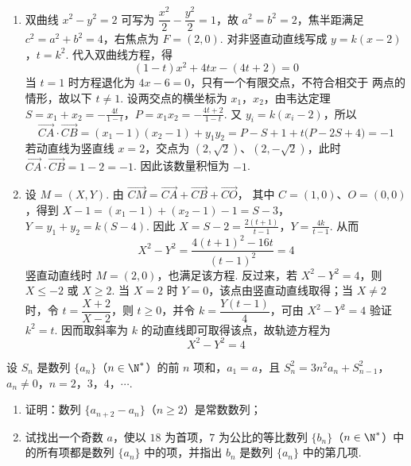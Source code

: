 \begin{solution}
\begin{enumerate}
\item 双曲线 \(x^2-y^2=2\) 可写为
\(\dfrac{x^2}{2}-\dfrac{y^2}{2}=1\)，故
\(a^2=b^2=2\)，焦半距满足 \(c^2=a^2+b^2=4\)，右焦点为
\(F=(2,0)\). 对非竖直动直线写成
\(y=k(x-2)\)，\(t=k^2\).
代入双曲线方程，得
\[
(1-t)x^2+4tx-(4t+2)=0
\]
当 \(t=1\) 时方程退化为 \(4x-6=0\)，只有一个有限交点，不符合相交于
两点的情形，故以下 \(t\ne1\). 设两交点的横坐标为 \(x_1\)，\(x_2\)，由韦达定理
\(S=x_1+x_2=-\frac{4t}{1-t}\)，\(P=x_1x_2=-\frac{4t+2}{1-t}\).
又 \(y_i=k(x_i-2)\)，所以
\[
\overrightarrow{CA}\cdot\overrightarrow{CB}
=(x_1-1)(x_2-1)+y_1y_2
=P-S+1+t\bigl(P-2S+4\bigr)=-1
\]
若动直线为竖直线 \(x=2\)，交点为 \((2,\sqrt2)\)、\((2,-\sqrt2)\)，此时
\(\overrightarrow{CA}\cdot\overrightarrow{CB}=1-2=-1\). 因此该数量积恒为
\(-1\).
\item 设 \(M=(X,Y)\). 由
\(\overrightarrow{CM}=\overrightarrow{CA}+\overrightarrow{CB}+\overrightarrow{CO}\)，
其中 \(C=(1,0)\)、\(O=(0,0)\)，得到
\(X-1=(x_1-1)+(x_2-1)-1=S-3\)，\(Y=y_1+y_2=k(S-4)\).
因此
\(X=S-2=\frac{2(t+1)}{t-1}\)，\(Y=\frac{4k}{t-1}\).
从而
\[
X^2-Y^2
=\frac{4(t+1)^2-16t}{(t-1)^2}=4
\]
竖直动直线时 \(M=(2,0)\)，也满足该方程. 反过来，若
\(X^2-Y^2=4\)，则 \(X\leqslant-2\) 或 \(X\geqslant2\). 当 \(X=2\) 时
\(Y=0\)，该点由竖直动直线取得；当 \(X\neq2\) 时，令
\(t=\dfrac{X+2}{X-2}\)，则 \(t\geqslant0\)，并令
\(k=\dfrac{Y(t-1)}4\)，可由 \(X^2-Y^2=4\) 验证 \(k^2=t\). 因而取斜率为
\(k\) 的动直线即可取得该点，故轨迹方程为
\[
X^2-Y^2=4
\]
\end{enumerate}
\end{solution}

\begin{problem}
设 \(S_{n}\) 是数列 \(\{a_{n}\}\)（\(n \in \N^{*}\)）的前 \(n\) 项和，\(a_{1} = a\)，且 \(S_{n}^{2} = 3n^{2}a_{n} + S_{n-1}^{2}\)，\(a_{n} \neq 0\)，\(n = 2\)，\(3\)，\(4\)，\(\cdots\).

\begin{enumerate}
\item 证明：数列 \(\{a_{n+2} - a_n\}\)（\(n \geqslant 2\)）是常数数列；
\item 试找出一个奇数 \(a\)，使以 \(18\) 为首项，\(7\) 为公比的等比数列 \(\{b_n\}\)（\(n \in \N^{*}\)）中的所有项都是数列 \(\{a_n\}\) 中的项，并指出 \(b_n\) 是数列 \(\{a_n\}\) 中的第几项.
\end{enumerate}
\end{problem}

